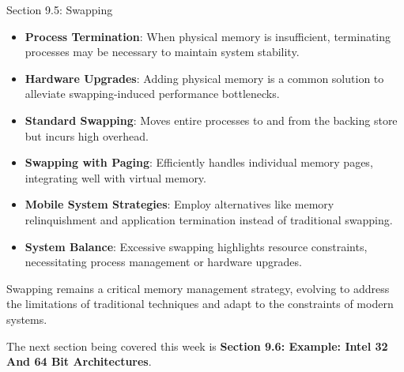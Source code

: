 \begin{notes}{Section 9.5: Swapping}
    \begin{highlight}
        \begin{itemize}
            \item \textbf{Process Termination}: When physical memory is insufficient, terminating processes may be necessary to maintain system stability.
            \item \textbf{Hardware Upgrades}: Adding physical memory is a common solution to alleviate swapping-induced performance bottlenecks.
        \end{itemize}
    \end{highlight}
    
    \begin{highlight}
        \begin{itemize}
            \item \textbf{Standard Swapping}: Moves entire processes to and from the backing store but incurs high overhead.
            \item \textbf{Swapping with Paging}: Efficiently handles individual memory pages, integrating well with virtual memory.
            \item \textbf{Mobile System Strategies}: Employ alternatives like memory relinquishment and application termination instead of traditional swapping.
            \item \textbf{System Balance}: Excessive swapping highlights resource constraints, necessitating process management or hardware upgrades.
        \end{itemize}
        Swapping remains a critical memory management strategy, evolving to address the limitations of traditional techniques and adapt to the constraints of modern systems.
    \end{highlight}
\end{notes}

The next section being covered this week is \textbf{Section 9.6: Example: Intel 32 And 64 Bit Architectures}.

